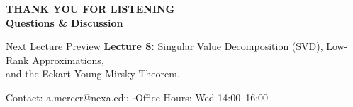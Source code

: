 \documentclass[10pt, aspectratio=169]{beamer}
\newcommand{\code}[1]{{\small\ttfamily\color{teal}#1}}
\begin{document}
\begin{frame}[plain]
  \vspace*{1.2cm}
  \begin{center}
    {\color{teal}\small\bfseries THANK YOU FOR LISTENING} \\[0.2cm]
    {\color{navy}\huge\bfseries Questions \& Discussion} \\[0.3cm]
    \par\vspace{0.4cm}
    
    \begin{conceptbox}{Next Lecture Preview}
      \centering
      \small
      \textbf{Lecture 8:} Singular Value Decomposition (SVD), Low-Rank Approximations, \\
      and the Eckart-Young-Mirsky Theorem.
    \end{conceptbox}
    
    \vspace*{0.3cm}
    {\color{slate}\small Contact: \code{a.mercer@nexa.edu} \quad$\cdot$\quad Office Hours: Wed 14:00--16:00}
  \end{center}
\end{frame}
\end{document}
